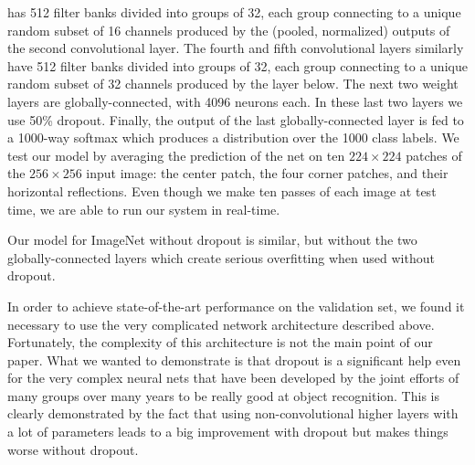 \documentclass[12pt]{article}
\begin{document}
has 512 filter banks divided into groups of 32, each group connecting
to a unique random subset of 16 channels produced by the (pooled, normalized)
outputs of the second convolutional layer. The fourth and fifth convolutional
layers similarly have 512 filter banks divided into groups of 32,
each group connecting to a unique random subset of 32 channels produced
by the layer below. The next two weight layers are globally-connected,
with 4096 neurons each. In these last two layers we use 50\% dropout.
Finally, the output of the last globally-connected layer is fed to
a 1000-way softmax which produces a distribution over the 1000 class
labels. We test our model by averaging the prediction of the net on
ten $224\times224$ patches of the $256\times256$ input image: the
center patch, the four corner patches, and their horizontal reflections.
Even though we make ten passes of each image at test time, we are
able to run our system in real-time.

Our model for ImageNet without dropout is similar, but without the
two globally-connected layers which create serious overfitting when
used without dropout.

In order to achieve state-of-the-art performance on the validation
set, we found it necessary to use the very complicated network
architecture described above. Fortunately, the complexity of this
architecture is not the main point of our paper. What we wanted to
demonstrate is that dropout is a significant help even for the very complex
neural nets that have been developed by the joint efforts of many
groups over many years to be really good at object recognition. This
is clearly demonstrated by the fact that using non-convolutional
higher layers with a lot of parameters leads to a big improvement with
dropout but makes things worse without dropout.
\end{document}
